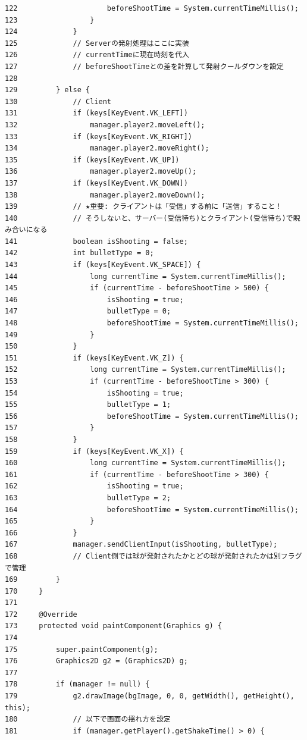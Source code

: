 \documentclass[11pt,a4j]{jarticle}
\begin{document}
\begin{small}
\begin{verbatim}
122                     beforeShootTime = System.currentTimeMillis();
123                 }
124             }
125             // Serverの発射処理はここに実装
126             // currentTimeに現在時刻を代入
127             // beforeShootTimeとの差を計算して発射クールダウンを設定
128 
129         } else {
130             // Client
131             if (keys[KeyEvent.VK_LEFT])
132                 manager.player2.moveLeft();
133             if (keys[KeyEvent.VK_RIGHT])
134                 manager.player2.moveRight();
135             if (keys[KeyEvent.VK_UP])
136                 manager.player2.moveUp();
137             if (keys[KeyEvent.VK_DOWN])
138                 manager.player2.moveDown();
139             // ★重要: クライアントは「受信」する前に「送信」すること！
140             // そうしないと、サーバー(受信待ち)とクライアント(受信待ち)で睨み合いになる
141             boolean isShooting = false;
142             int bulletType = 0;
143             if (keys[KeyEvent.VK_SPACE]) {
144                 long currentTime = System.currentTimeMillis();
145                 if (currentTime - beforeShootTime > 500) {
146                     isShooting = true;
147                     bulletType = 0;
148                     beforeShootTime = System.currentTimeMillis();
149                 }
150             }
151             if (keys[KeyEvent.VK_Z]) {
152                 long currentTime = System.currentTimeMillis();
153                 if (currentTime - beforeShootTime > 300) {
154                     isShooting = true;
155                     bulletType = 1;
156                     beforeShootTime = System.currentTimeMillis();
157                 }
158             }
159             if (keys[KeyEvent.VK_X]) {
160                 long currentTime = System.currentTimeMillis();
161                 if (currentTime - beforeShootTime > 300) {
162                     isShooting = true;
163                     bulletType = 2;
164                     beforeShootTime = System.currentTimeMillis();
165                 }
166             }
167             manager.sendClientInput(isShooting, bulletType);
168             // Client側では球が発射されたかとどの球が発射されたかは別フラグで管理
169         }
170     }
171 
172     @Override
173     protected void paintComponent(Graphics g) {
174 
175         super.paintComponent(g);
176         Graphics2D g2 = (Graphics2D) g;
177 
178         if (manager != null) {
179             g2.drawImage(bgImage, 0, 0, getWidth(), getHeight(), this);
180             // 以下で画面の揺れ方を設定
181             if (manager.getPlayer().getShakeTime() > 0) {

\end{verbatim}
\end{small}
\end{document}
